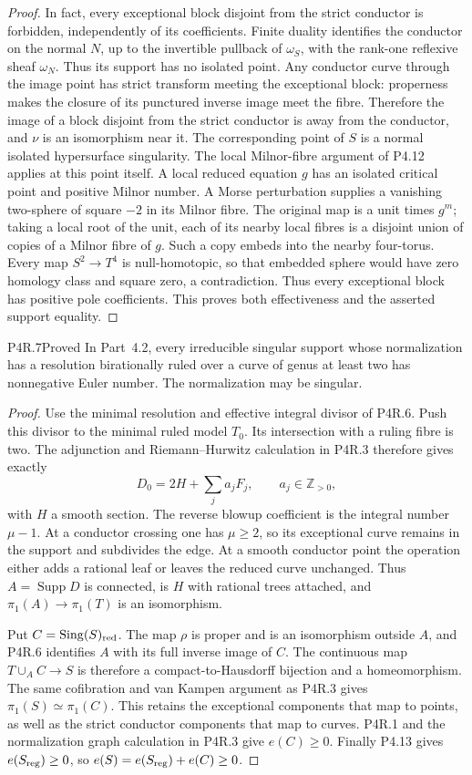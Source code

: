 \begin{proof}
In fact, every exceptional block disjoint from
the strict conductor is forbidden, independently
of its coefficients. Finite duality identifies
the conductor on the normal $N$, up to the
invertible pullback of $\omega_S$, with the
rank-one reflexive sheaf $\omega_N$. Thus its
support has no isolated point. Any conductor
curve through the image point has strict
transform meeting the exceptional block:
properness makes the closure of its punctured
inverse image meet the fibre. Therefore the
image of a block disjoint from the strict
conductor is away from the conductor, and
$\nu$ is an isomorphism near it. The
corresponding point of $S$ is a normal isolated
hypersurface singularity. The local
Milnor-fibre argument of P4.12 applies
at this point itself. A local reduced
equation $g$ has an isolated critical
point and positive Milnor number. A
Morse perturbation supplies a vanishing
two-sphere of square $-2$ in its Milnor
fibre. The original map is a unit times
$g^m$; taking a local root of the unit,
each of its nearby local fibres is a
disjoint union of copies of a Milnor
fibre of $g$. Such a copy embeds into
the nearby four-torus. Every map
$S^2\to T^4$ is null-homotopic, so that
embedded sphere would have zero
homology class and square zero, a
contradiction. Thus every exceptional
block has positive pole coefficients.
This proves both effectiveness and the
asserted support equality.
\end{proof}

\begin{statement}{P4R.7}{Proved}
In Part~4.2, every irreducible singular
support whose normalization has a
resolution birationally ruled over a
curve of genus at least two has
nonnegative Euler number. The
normalization may be singular.
\end{statement}
\begin{proof}
Use the minimal resolution and effective
integral divisor of P4R.6. Push this
divisor to the minimal ruled model
$T_0$. Its intersection with a ruling
fibre is two. The adjunction and
Riemann--Hurwitz calculation in P4R.3
therefore gives exactly
\[
 D_0=2H+\sum_j a_jF_j,
 \qquad a_j\in\mathbb Z_{>0},
\]
with $H$ a smooth section. The reverse
blowup coefficient is the integral
number $\mu-1$. At a conductor crossing
one has $\mu\ge2$, so its exceptional
curve remains in the support and
subdivides the edge. At a smooth
conductor point the operation either
adds a rational leaf or leaves the
reduced curve unchanged. Thus
$A=\operatorname{Supp}D$ is connected,
is $H$ with rational trees attached,
and $\pi_1(A)\to\pi_1(T)$ is an
isomorphism.

Put $C=\operatorname{Sing}(S)_{\rm red}$.
The map $\rho$ is proper and is an
isomorphism outside $A$, and P4R.6
identifies $A$ with its full inverse
image of $C$. The continuous map
$T\cup_A C\to S$ is therefore a
compact-to-Hausdorff bijection and a
homeomorphism. The same cofibration
and van Kampen argument as P4R.3 gives
$\pi_1(S)\simeq\pi_1(C)$. This retains
the exceptional components that map
to points, as well as the strict
conductor components that map to
curves. P4R.1 and the normalization
graph calculation in P4R.3 give
$e(C)\ge0$. Finally P4.13 gives
$e(S_{\rm reg})\ge0$, so
$e(S)=e(S_{\rm reg})+e(C)\ge0$.
\end{proof}

